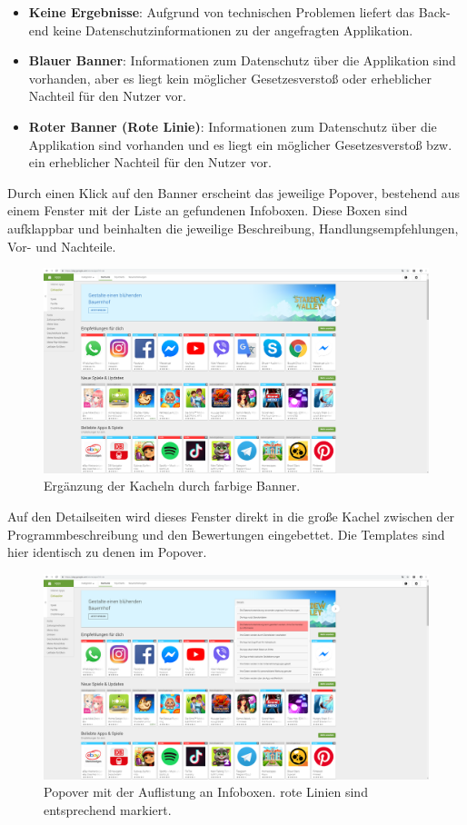 \begin{itemize}
	\item \textbf{\glqq Keine Ergebnisse\grqq{}}:
	Aufgrund von technischen Problemen liefert das Back-end keine Datenschutzinformationen zu der angefragten Applikation.
	\item \textbf{Blauer Banner}:
	Informationen zum Datenschutz über die Applikation sind vorhanden, aber es liegt kein möglicher Gesetzesverstoß oder erheblicher Nachteil für den Nutzer vor.
	\item \textbf{Roter Banner (\glqq Rote Linie\grqq{})}:
	Informationen zum Datenschutz über die Applikation sind vorhanden und es liegt ein möglicher Gesetzesverstoß bzw. ein erheblicher Nachteil für den Nutzer vor.
\end{itemize}

Durch einen Klick auf den Banner erscheint das jeweilige Popover, bestehend aus einem Fenster mit der Liste an gefundenen Infoboxen. Diese Boxen sind aufklappbar und beinhalten die jeweilige Beschreibung, Handlungsempfehlungen, Vor- und Nachteile.

\begin{figure}[h]
	\centering
	\includegraphics[width=1\textwidth]{pics/ergebnis1.png}
	\caption{Ergänzung der Kacheln durch farbige Banner.}
	\label{ergebnis1}
\end{figure}

Auf den Detailseiten wird dieses Fenster direkt in die große Kachel zwischen der Programmbeschreibung und den Bewertungen eingebettet. Die Templates sind hier identisch zu denen im Popover.

\begin{figure}[h]
	\centering
	\includegraphics[width=1\textwidth]{pics/ergebnis2.png}
	\caption{Popover mit der Auflistung an Infoboxen. \glqq rote Linien \grqq{} sind entsprechend markiert.}
	\label{ergebnis2}
\end{figure}

